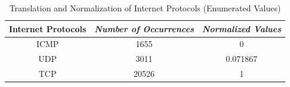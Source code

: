 %
%

\begin{table}
\caption{Translation and Normalization of Internet Protocols (Enumerated Values)}

\begin{tabular}{|c|c|c|}
\hline
\multicolumn{1}{|p{2cm}|}{\centering \textbf{Internet Protocols}} & \multicolumn{1}{|p{2cm}|}{\centering \textbf{\textit{Number of Occurrences}}} & \multicolumn{1}{|p{2cm}|}{\centering \textbf{\textit{Normalized Values}}}\\
\hline
ICMP & 1655 & 0\\
UDP & 3011 & 0.071867 \\
TCP & 20526 & 1 \\
\hline
\end{tabular}
\label{tab4}

\end{table}

